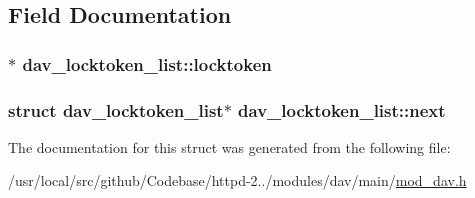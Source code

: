 \subsection{Field Documentation}
\subsubsection[{\texorpdfstring{locktoken}{locktoken}}]{$\ast$ dav\+\_\+locktoken\+\_\+list\+::locktoken}\hypertarget{structdav__locktoken__list_ab9db3300c9962b8c25bd926c8136f92a}{}\label{structdav__locktoken__list_ab9db3300c9962b8c25bd926c8136f92a}
\subsubsection[{\texorpdfstring{next}{next}}]{\setlength{\rightskip}{0pt plus 5cm}struct {\bf dav\+\_\+locktoken\+\_\+list}$\ast$ dav\+\_\+locktoken\+\_\+list\+::next}\hypertarget{structdav__locktoken__list_a24086930c97085ed9d3a0a7175b41c89}{}\label{structdav__locktoken__list_a24086930c97085ed9d3a0a7175b41c89}


The documentation for this struct was generated from the following file\+:\begin{DoxyCompactItemize}
\item 
/usr/local/src/github/\+Codebase/httpd-\/2../modules/dav/main/\hyperlink{mod__dav_8h}{mod\+\_\+dav.\+h}\end{DoxyCompactItemize}

